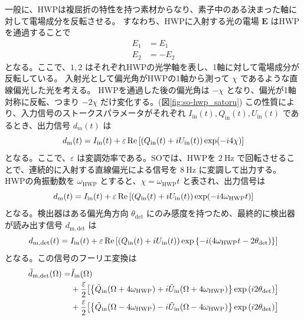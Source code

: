 \documentclass[../../main.tex]{subfiles}
\begin{document}
一般に、HWPは複屈折の特性を持つ素材からなり、素子中のある決まった軸に対して電場成分を反転させる。
すなわち、HWPに入射する光の電場 $\bm{E}$ はHWPを通過することで
\begin{align}
    E_{1} &= E_{1} \\
    E_{2} &= -E_{2}
\end{align}
となる。ここで、$1, 2$ はそれぞれHWPの光学軸を表し、1軸に対して電場成分が反転している。
入射光として偏光角がHWPの1軸から測って $\chi$ であるような直線偏光した光を考える。
HWPを通過した後の偏光角は $-\chi$ となり、偏光が1軸対称に反転、つまり $-2\chi$ だけ変化する。(図\ref{fig:so-hwp_satoru})
この性質により、入力信号のストークスパラメータがそれぞれ $I_{\mathrm{in}}(t), Q_{\mathrm{in}}(t), U_{\mathrm{in}}(t)$ であるとき、出力信号 $d_m(t)$ は
\begin{equation}
    d_{\mathrm{m}}(t) = I_{\mathrm{in}}(t) + \varepsilon\Re\qty[\qty(Q_{\mathrm{in}}(t)+iU_{\mathrm{in}}(t))\exp(-i 4\chi)]
\end{equation}
となる。ここで、$\varepsilon$ は変調効率である。SOでは、HWPを $2\ \mathrm{Hz}$ で回転させることで、連続的に入射する直線偏光による信号を $8\ \mathrm{Hz}$ に変調して出力する。
HWPの角振動数を $\omega_{\mathrm{HWP}}$ とすると、$\chi = \omega_{\mathrm{HWP}}t$ と表され、出力信号は
\begin{equation}
    d_{\mathrm{m}}(t) = I_{\mathrm{in}}(t) + \varepsilon\Re\qty[\qty(Q_{\mathrm{in}}(t)+iU_{\mathrm{in}}(t))\exp(-i 4\omega_{\mathrm{HWP}}t)]
\end{equation}
となる。検出器はある偏光角方向 $\theta_{\mathrm{det}}$ にのみ感度を持つため、最終的に検出器が読み出す信号 $d_{\mathrm{m}, \mathrm{det}}$ は
\begin{equation}
    \label{eq:so-hwp_modulation}
    d_{\mathrm{m}, \mathrm{det}}(t) = I_{\mathrm{in}}(t) + \varepsilon\Re\qty[\qty(Q_{\mathrm{in}}(t)+iU_{\mathrm{in}}(t))\exp\qty{-i \qty(4\omega_{\mathrm{HWP}}t - 2\theta_{\mathrm{det}})}]
\end{equation}
となる。この信号のフーリエ変換は
\begin{equation}
    \begin{split}
        \tilde{d}_{\mathrm{m}, \mathrm{det}}(\Omega) = &\tilde{I}_{\mathrm{in}}(\Omega) \\
            &+ \dfrac{\varepsilon}{2}\qty[\qty{\tilde{Q}_{\mathrm{in}}(\Omega+4\omega_{\mathrm{HWP}})+i\tilde{U}_{\mathrm{in}}(\Omega+4\omega_{\mathrm{HWP}})}\exp\qty(i2\theta_{\mathrm{det}})] \\
            &+ \dfrac{\varepsilon}{2}\qty[\qty{\tilde{Q}_{\mathrm{in}}(\Omega-4\omega_{\mathrm{HWP}})-i\tilde{U}_{\mathrm{in}}(\Omega-4\omega_{\mathrm{HWP}})}\exp\qty(i2\theta_{\mathrm{det}})]
    \end{split}
\end{equation}
\end{document}
